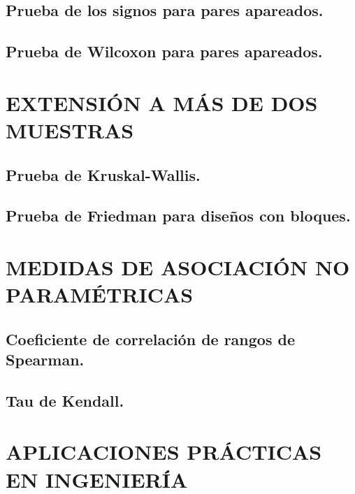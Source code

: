 \documentclass[
  oneside]{book}
\begin{document}
\subsection{Prueba de los signos para pares apareados.}\label{prueba-de-los-signos-para-pares-apareados.}

\subsection{Prueba de Wilcoxon para pares apareados.}\label{prueba-de-wilcoxon-para-pares-apareados.}

\section{EXTENSIÓN A MÁS DE DOS MUESTRAS}\label{extensiuxf3n-a-muxe1s-de-dos-muestras}

\subsection{Prueba de Kruskal-Wallis.}\label{prueba-de-kruskal-wallis.}

\subsection{Prueba de Friedman para diseños con bloques.}\label{prueba-de-friedman-para-diseuxf1os-con-bloques.}

\section{MEDIDAS DE ASOCIACIÓN NO PARAMÉTRICAS}\label{medidas-de-asociaciuxf3n-no-paramuxe9tricas}

\subsection{Coeficiente de correlación de rangos de Spearman.}\label{coeficiente-de-correlaciuxf3n-de-rangos-de-spearman.}

\subsection{Tau de Kendall.}\label{tau-de-kendall.}

\section{APLICACIONES PRÁCTICAS EN INGENIERÍA}\label{aplicaciones-pruxe1cticas-en-ingenieruxeda}
\end{document}
